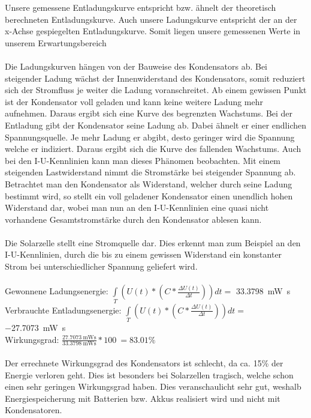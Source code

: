 Unsere gemessene Entladungskurve entspricht bzw. ähnelt der theoretisch berechneten Entladungskurve. Auch unsere Ladungskurve entspricht der an der x-Achse gespiegelten Entladungskurve. Somit liegen unsere gemessenen Werte in unserem Erwartungsbereich
\\
\\
Die Ladungskurven hängen von der Bauweise des Kondensators ab. 
Bei steigender Ladung wächst der Innenwiderstand des Kondensators, somit reduziert sich der Stromfluss je weiter die Ladung voranschreitet. Ab einem gewissen Punkt ist der Kondensator voll geladen und kann keine weitere Ladung mehr aufnehmen. Daraus ergibt sich eine Kurve des begrenzten Wachstums.
Bei der Entladung gibt der Kondensator seine Ladung ab. Dabei ähnelt er einer endlichen Spannungsquelle. Je mehr Ladung er abgibt, desto geringer wird die Spannung welche er indiziert. Daraus ergibt sich die Kurve des fallenden Wachstums.
Auch bei den I-U-Kennlinien kann man dieses Phänomen beobachten. Mit einem steigenden Lastwiderstand nimmt die Stromstärke bei steigender Spannung ab. Betrachtet man den Kondensator als Widerstand, welcher durch seine Ladung bestimmt wird, so stellt ein voll geladener Kondensator einen unendlich hohen Widerstand dar, wobei man nun an den I-U-Kennlinien eine quasi nicht vorhandene Gesamtstromstärke durch den Kondensator ablesen kann.
\\
\\
Die Solarzelle stellt eine Stromquelle dar. Dies erkennt man zum Beispiel an den I-U-Kennlinien, durch die bis zu einem gewissen Widerstand ein konstanter Strom bei unterschiedlicher Spannung geliefert wird.
\\
\\
Gewonnene Ladungsenergie: $\int\limits _T (U(t) * (C * \frac{\Delta U(t)}{\Delta t}))dt = $ \SI{33.3798}{\milli\watt\second}\\
Verbrauchte Entladungsenergie: $\int\limits _T (U(t) * (C * \frac{\Delta U(t)}{\Delta t}))dt = $ \SI{-27.7073}{\milli\watt\second}\\
Wirkungsgrad: $\frac{\SI{27.7073}{\milli\watt\second}}{\SI{33.3798}{\milli\watt\second}} * 100 ~= 83.01\%$\\
\\
Der errechnete Wirkungsgrad des Kondensators ist schlecht, da ca. 15\% der Energie verloren geht. Dies ist besonders bei Solarzellen tragisch, welche schon einen sehr geringen Wirkungsgrad haben. Dies veranschaulicht sehr gut, weshalb Energiespeicherung mit Batterien bzw. Akkus realisiert wird und nicht mit Kondensatoren.

